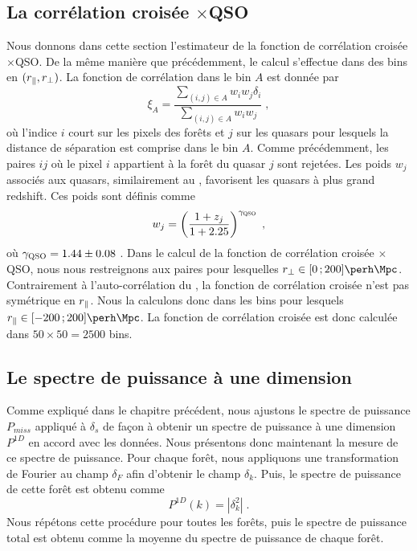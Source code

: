 \documentclass[11pt, twoside, a4paper, openright]{report}
\begin{document}
\subsection{La corrélation croisée \lya{}$\times$QSO}
Nous donnons dans cette section l'estimateur de la fonction de corrélation croisée \lya{}$\times$QSO. De la même manière que précédemment, le calcul s'effectue dans des bins en $(r_{\parallel}{}, r_{\perp}{})$. La fonction de corrélation dans le bin $A$ est donnée par
\begin{equation}
  \label{eq:xiqf}
  \xi_A = \frac{
    \sum\limits_{(i,j)\in A} w_i w_j \delta_i
  }{
    \sum\limits_{(i,j)\in A} w_i w_j
  }
  \; ,
\end{equation}
où l'indice $i$ court sur les pixels des forêts et $j$ sur les quasars pour lesquels la distance de séparation est comprise dans le bin $A$. Comme précédemment, les paires $ij$ où le pixel $i$ appartient à la forêt du quasar $j$ sont rejetées.
Les poids $w_j$ associés aux quasars, similairement au \lya{}, favorisent les quasars à plus grand redshift. Ces poids sont définis comme
\begin{equation}
  \label{eq:weights3}
  w_j = \left(\frac{1 + z_j}{1 + \num{2.25}}\right)^{\gamma_{\textsc{QSO}}} \; ,
\end{equation}
où $\gamma_{\textsc{QSO}} = \num{1.44} \pm \num{0.08}$ \citep{Bourboux2019}. Dans le calcul de la fonction de corrélation croisée \lya{}$\times$QSO, nous nous restreignons aux paires pour lesquelles $\rperp{} \in [0 \, ; 200] \si{\perh\Mpc}$.
Contrairement à l'auto-corrélation du \lya{}, la fonction de corrélation croisée n'est pas symétrique en $r_{\parallel}{}$. Nous la calculons donc dans les bins pour lesquels $\rpar{} \in [-200 \, ; 200] \si{\perh\Mpc}$. La fonction de corrélation croisée est donc calculée dans $50 \times 50 = \num{2500}$ bins.


\subsection{Le spectre de puissance à une dimension}
Comme expliqué dans le chapitre précédent, nous ajustons le spectre de puissance $P_{miss}$ appliqué à $\delta_s$ de façon à obtenir un spectre de puissance à une dimension $P^{1D}$ en accord avec les données. Nous présentons donc maintenant la mesure de ce spectre de puissance. Pour chaque forêt, nous appliquons une transformation de Fourier au champ $\delta_F$ afin d'obtenir le champ $\delta_k$. Puis, le spectre de puissance de cette forêt est obtenu comme
\begin{equation}
  P^{1D}(k) = | \delta_k^2 | \; .
\end{equation}
Nous répétons cette procédure pour toutes les forêts, puis le spectre de puissance total est obtenu comme la moyenne du spectre de puissance de chaque forêt.
\end{document}
